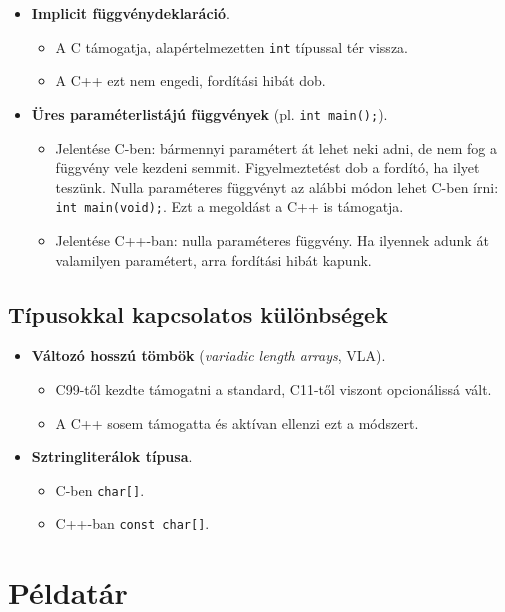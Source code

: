 \documentclass[a4paper, 11pt, oneside]{book}
\begin{document}
\begin{itemize}
	\item \textbf{Implicit függvénydeklaráció}.
	\begin{itemize}
		\item A C támogatja, alapértelmezetten \verb*|int| típussal tér vissza.
		\item A C++ ezt nem engedi, fordítási hibát dob.
	\end{itemize}
	\item \textbf{Üres paraméterlistájú függvények} (pl. \verb|int main();|).
	\begin{itemize}
		\item Jelentése C-ben: bármennyi paramétert át lehet neki adni, de nem fog a függvény vele kezdeni semmit. Figyelmeztetést dob a fordító, ha ilyet teszünk. Nulla paraméteres függvényt az alábbi módon lehet C-ben írni: \verb|int main(void);|. Ezt a megoldást a C++ is támogatja.
		\item Jelentése C++-ban: nulla paraméteres függvény. Ha ilyennek adunk át valamilyen paramétert, arra fordítási hibát kapunk. 
	\end{itemize}
\end{itemize}


\subsection{Típusokkal kapcsolatos különbségek}

\begin{itemize}
	\item \textbf{Változó hosszú tömbök} (\textit{variadic length arrays}, VLA).
	\begin{itemize}
		\item C99-től kezdte támogatni a standard, C11-től viszont opcionálissá vált.
		\item A C++ sosem támogatta és aktívan ellenzi ezt a módszert.
	\end{itemize}
	\item \textbf{Sztringliterálok típusa}.
	\begin{itemize}
		\item C-ben \verb|char[]|.
		\item C++-ban \verb|const char[]|.
	\end{itemize}
\end{itemize}

\newpage

\section{Példatár}
\end{document}
